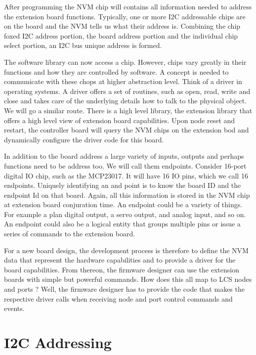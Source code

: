 After programming the NVM chip will contains all information needed to address the extension board functions. Typically, one or more I2C addressable chips are on the board and the NVM tells us what their address is. Combining the chip foxed I2C address portion, the board address portion and the individual chip select portion, an I2C bus unique address is formed. 

The software library can now access a chip. However, chips vary greatly in their functions and how they are controlled by software. A concept is needed to communicate with these chops at  higher abstraction level. Think of a driver in operating systems. A driver offers a set of routines, such as open, read, write and close and takes care of the underlying details how to talk to the physical object. We will go a similar route. There is a high level library, the extension library that offers a high level view of extension board capabilities. Upon node reset and restart, the controller board will query the NVM chips on the extension bod and dynamically configure the driver code for this board.

In addition to the board address a large variety of inputs, outputs and perhaps functions need to be address too. We will call them endpoints. Consider  16-port digital IO chip, such as the MCP23017. It will have 16 IO pins, which we call 16 endpoints. Uniquely identifying an and point is to know the board ID and the endpoint Id on that board. Again, all this information is stored in the NVM  chip at extension board conjuration time. An endpoint could be a variety of things. For example a plan digital output, a servo output, and analog input, and so on. An endpoint could also be a logical entity that groups multiple pins or issue a series of commands to the extension board.

For a new board design, the development process is therefore to define the NVM data that represent the hardware capabilities  and to provide a driver for the board capabilities. From thereon, the firmware designer can use the extension boards with simple but powerful commands. How does this all map to LCS nodes and ports ? Well, the firmware designer has to provide the code that makes the respective driver calls when receiving node and port control commands and events.

\section{I2C Addressing}

